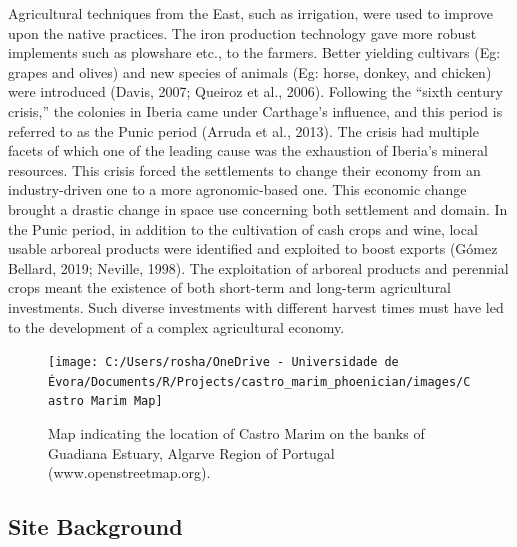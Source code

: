 \documentclass[3p]{elsarticle} %
\begin{document}
Agricultural techniques from the East, such as irrigation, were used to improve upon the native practices. The iron production technology gave more robust implements such as plowshare etc., to the farmers. Better yielding cultivars (Eg: grapes and olives) and new species of animals (Eg: horse, donkey, and chicken) were introduced (Davis, 2007; Queiroz et al., 2006). Following the ``sixth century crisis,'' the colonies in Iberia came under Carthage's influence, and this period is referred to as the Punic period (Arruda et al., 2013). The crisis had multiple facets of which one of the leading cause was the exhaustion of Iberia's mineral resources. This crisis forced the settlements to change their economy from an industry-driven one to a more agronomic-based one. This economic change brought a drastic change in space use concerning both settlement and domain. In the Punic period, in addition to the cultivation of cash crops and wine, local usable arboreal products were identified and exploited to boost exports (Gómez Bellard, 2019; Neville, 1998). The exploitation of arboreal products and perennial crops meant the existence of both short-term and long-term agricultural investments. Such diverse investments with different harvest times must have led to the development of a complex agricultural economy.

\begin{figure}
\texttt{[image: C:/Users/rosha/OneDrive - Universidade de Évora/Documents/R/Projects/castro\_marim\_phoenician/images/Castro Marim Map]} \caption{Map indicating the location of Castro Marim on the banks of Guadiana Estuary, Algarve Region of Portugal (www.openstreetmap.org).}\label{fig:castro-marim-loc}
\end{figure}

\hypertarget{site-background}{%
\subsection{Site Background}\label{site-background}}
\end{document}
